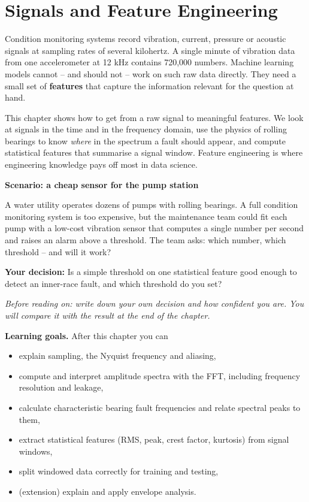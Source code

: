 \documentclass[
  letterpaper,
  DIV=11,
  numbers=noendperiod]{scrreprt}
\providecommand{\tightlist}{%
  \setlength{\itemsep}{0pt}\setlength{\parskip}{0pt}}\usepackage{longtable,booktabs,array}
\begin{document}
\chapter{Signals and Feature
Engineering}\label{signals-and-feature-engineering}

Condition monitoring systems record vibration, current, pressure or
acoustic signals at sampling rates of several kilohertz. A single minute
of vibration data from one accelerometer at 12 kHz contains 720,000
numbers. Machine learning models cannot -- and should not -- work on
such raw data directly. They need a small set of \textbf{features} that
capture the information relevant for the question at hand.

This chapter shows how to get from a raw signal to meaningful features.
We look at signals in the time and in the frequency domain, use the
physics of rolling bearings to know \emph{where} in the spectrum a fault
should appear, and compute statistical features that summarise a signal
window. Feature engineering is where engineering knowledge pays off most
in data science.

\textbf{Scenario: a cheap sensor for the pump station}

A water utility operates dozens of pumps with rolling bearings. A full
condition monitoring system is too expensive, but the maintenance team
could fit each pump with a low-cost vibration sensor that computes a
single number per second and raises an alarm above a threshold. The team
asks: which number, which threshold -- and will it work?

\textbf{Your decision:} Is a simple threshold on one statistical feature
good enough to detect an inner-race fault, and which threshold do you
set?

\emph{Before reading on: write down your own decision and how confident
you are. You will compare it with the result at the end of the chapter.}

\textbf{Learning goals.} After this chapter you can

\begin{itemize}
\tightlist
\item
  explain sampling, the Nyquist frequency and aliasing,
\item
  compute and interpret amplitude spectra with the FFT, including
  frequency resolution and leakage,
\item
  calculate characteristic bearing fault frequencies and relate spectral
  peaks to them,
\item
  extract statistical features (RMS, peak, crest factor, kurtosis) from
  signal windows,
\item
  split windowed data correctly for training and testing,
\item
  (extension) explain and apply envelope analysis.
\end{itemize}
\end{document}

